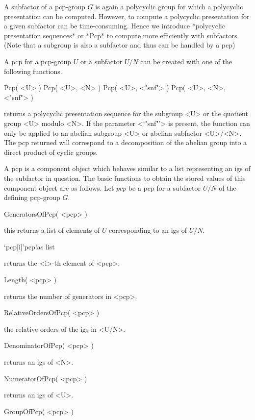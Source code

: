 \label{pcps}

A subfactor of a pcp-group $G$ is again a polycyclic group for which a
polycyclic presentation can be computed. However, to compute a polycyclic
presentation for  a given subfactor  can  be time-consuming.  Hence we
introduce *polycyclic presentation sequences* or *Pcp* to compute more
efficiently with subfactors. (Note that a subgroup is also a subfactor 
and  thus can be handled by a pcp)

A pcp for a pcp-group $U$ or a subfactor $U /  N$ can be created with
one of the following functions.

\>Pcp( <U> )
\>Pcp( <U>, <N> )
\>Pcp( <U>, <"snf"> )
\>Pcp( <U>, <N>, <"snf"> )

returns a polycyclic presentation sequence for the subgroup <U> or the
quotient group  <U> modulo <N>.  If the  parameter <`"snf"'> is present,
the function can only be applied to an abelian  subgroup <U>  or abelian
subfactor   <U>/<N>.   The pcp  returned  will correspond     to a
decomposition of  the abelian  group  into a direct  product of cyclic
groups.

\bigskip
A  pcp   is  a component  object which    behaves similar  to   a list
representing an igs of the  subfactor in question. The basic functions
to   obtain  the  stored  values of  this     component object  are as
follows.  Let $pcp$  be a pcp  for  a subfactor $U/N$  of the defining
pcp-group $G$.

\>GeneratorsOfPcp( <pcp> )

this returns a list   of elements of $U$   corresponding to an  igs of
$U/N$.

\>`pcp[i]'{pcp}!{as list}

returns the <i>-th element of <pcp>.

\>Length( <pcp> )

returns the number of generators in <pcp>.

\>RelativeOrdersOfPcp( <pcp> )

the relative orders of the igs in <U/N>.

\>DenominatorOfPcp( <pcp> )

returns an igs of <N>. 

\>NumeratorOfPcp( <pcp> )

returns an igs of <U>.

\>GroupOfPcp( <pcp> )

